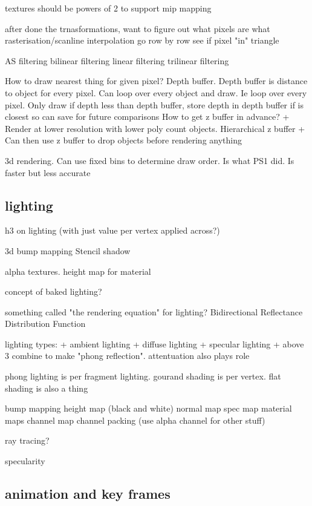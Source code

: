 textures should be powers of 2 to support mip mapping

after done the trnasformations, want to figure out what pixels are what
rasterisation/scanline interpolation
go row by row
see if pixel "in" triangle

AS filtering
bilinear filtering
linear filtering
trilinear filtering

How to draw nearest thing for given pixel? Depth buffer. Depth buffer is distance to object for every pixel.
Can loop over every object and draw. Ie loop over every pixel. Only draw if depth less than depth buffer, store depth in depth buffer if is closest so can save for future comparisons
How to get z buffer in advance?
+ Render at lower resolution with lower poly count objects. Hierarchical z buffer
+ Can then use z buffer to drop objects before rendering anything

3d rendering. Can use fixed bins to determine draw order. Is what PS1 did. Is faster but less accurate

\subsection{lighting}

h3 on lighting (with just value per vertex applied across?)

3d bump mapping
Stencil shadow

alpha textures. height map for material

concept of baked lighting?

something called "the rendering equation" for lighting?
Bidirectional Reflectance Distribution Function

lighting types:
+ ambient lighting
+ diffuse lighting
+ specular lighting
+ above 3 combine to make "phong reflection". attentuation also plays role

phong lighting is per fragment lighting. gourand shading is per vertex. flat shading is also a thing


bump mapping
height map (black and white)
normal map
spec map
material maps
channel map
channel packing (use alpha channel for other stuff)

ray tracing?

specularity

\subsection{animation and key frames}

